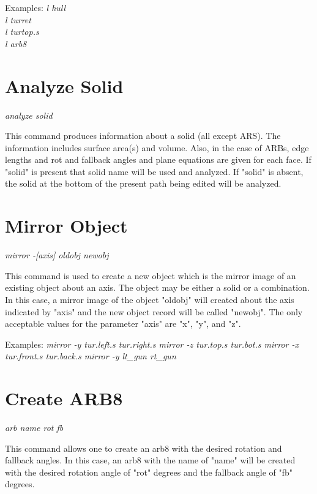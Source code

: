 Examples:
{\em
               l hull \\
               l turret \\
               l turtop.s \\
               l arb8 \\
}

\section{Analyze Solid}

{\em \center
analyze solid
}

This command produces information about a solid (all except ARS).
The information includes surface area(s) and volume.
Also, in the case of ARBs, edge lengths and rot and fallback angles
and plane equations are given for each face.
If "solid" is present that solid name will be used and analyzed.
If "solid" is absent, the solid at the bottom of the present path
being edited will be analyzed.

\section{Mirror Object}

{\em \center
mirror -[axis] oldobj newobj
}

This command is used to create a new object which is
the mirror image of an existing object about an axis.
The object may be either a solid or a combination.
In this case, a mirror image of the object "oldobj" will created
about the axis indicated by "axis" and the new object record will
be called "newobj".
The only acceptable values for the parameter "axis" are "x", "y", and "z".

Examples:
{\em
              mirror -y tur.left.s tur.right.s
              mirror -z tur.top.s tur.bot.s
              mirror -x tur.front.s tur.back.s
              mirror -y lt\_gun rt\_gun
}

\section{Create ARB8}

{\em \center
arb name rot fb
}

This command allows one to create an arb8
with the desired rotation and fallback angles.
In this case, an arb8 with the name of "name" will be created with the desired
rotation angle of "rot" degrees and the fallback angle of "fb" degrees.

